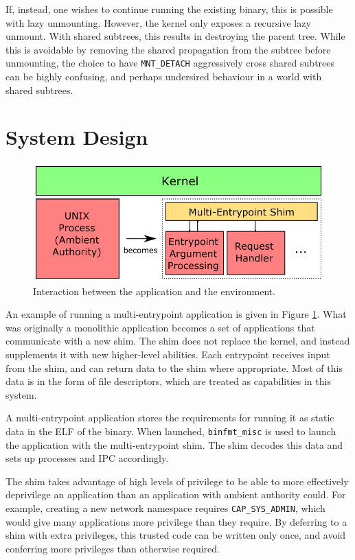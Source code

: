 \documentclass[sigplan]{acmart}
\begin{document}
If, instead, one wishes to continue running the existing binary, this is possible with lazy unmounting. However, the kernel only exposes a recursive lazy unmount. With shared subtrees, this results in destroying the parent tree. While this is avoidable by removing the shared propagation from the subtree before unmounting, the choice to have \texttt{MNT\_DETACH} aggressively cross shared subtrees can be highly confusing, and perhaps undersired behaviour in a world with shared subtrees.

\section{System Design}

\begin{figure}
    \centering
    \includegraphics[width=\columnwidth]{figures/self-compartmentalisation-interactions.png}
    \caption{Interaction between the application and the environment.}
    \label{fig:self-compartmentalisation-interactions}
\end{figure}

An example of running a multi-entrypoint application is given in Figure \ref{fig:self-compartmentalisation-interactions}. What was originally a monolithic application becomes a set of applications that communicate with a new shim. The shim does not replace the kernel, and instead supplements it with new higher-level abilities. Each entrypoint receives input from the shim, and can return data to the shim where appropriate. Most of this data is in the form of file descriptors, which are treated as capabilities in this system.

A multi-entrypoint application stores the requirements for running it as static data in the ELF of the binary. When launched, \texttt{binfmt\_misc} is used to launch the application with the multi-entrypoint shim. The shim decodes this data and sets up processes and IPC accordingly.

The shim takes advantage of high levels of privilege to be able to more effectively deprivilege an application than an application with ambient authority could. For example, creating a new network namespace requires \texttt{CAP\_SYS\_ADMIN}, which would give many applications more privilege than they require. By deferring to a shim with extra privileges, this trusted code can be written only once, and avoid conferring more privileges than otherwise required.
\end{document}
